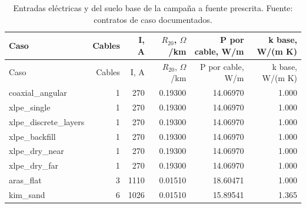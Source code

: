 \begingroup\footnotesize\setlength{\tabcolsep}{3pt}
\begin{longtable}{L{4.2cm}rrrrr}
\caption{Entradas eléctricas y del suelo base de la campaña a fuente prescrita. Fuente: contratos de caso documentados.}\label{tab:explicit-case-inputs}\\
\toprule
Caso & Cables & I, A & $R_{20}$, $\Omega$/km & P por cable, W/m & k base, W/(m K)\\
\midrule\endfirsthead
\toprule
Caso & Cables & I, A & $R_{20}$, $\Omega$/km & P por cable, W/m & k base, W/(m K)\\
\midrule\endhead
coaxial\_angular & 1 & 270 & 0.19300 & 14.06970 & 1.000\\
xlpe\_single & 1 & 270 & 0.19300 & 14.06970 & 1.000\\
xlpe\_discrete\_layers & 1 & 270 & 0.19300 & 14.06970 & 1.000\\
xlpe\_backfill & 1 & 270 & 0.19300 & 14.06970 & 1.000\\
xlpe\_dry\_near & 1 & 270 & 0.19300 & 14.06970 & 1.000\\
xlpe\_dry\_far & 1 & 270 & 0.19300 & 14.06970 & 1.000\\
aras\_flat & 3 & 1110 & 0.01510 & 18.60471 & 1.000\\
kim\_sand & 6 & 1026 & 0.01510 & 15.89541 & 1.365\\
\bottomrule\end{longtable}\endgroup

